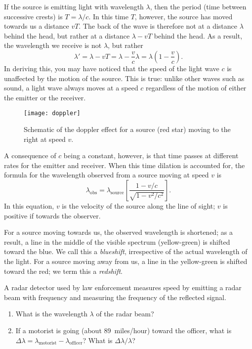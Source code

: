 If the source is emitting light with wavelength $\lambda$, then the period (time between successive crests) is $T = \lambda/c$.  In this time $T$, however, the source has moved towards us a distance $vT$. The back of the wave is therefore not at a distance $\lambda$ behind the head, but rather at a distance $\lambda - vT$ behind the head.  As a result, the wavelength we receive is not $\lambda$, but rather
\[ \lambda' = \lambda - vT = \lambda - \frac{v}{c}\lambda = \lambda\left(1-\frac{v}{c}\right). \]
In deriving this, you may have noticed that the speed of the light wave $c$ is unaffected by the motion of the source.  This is true: unlike other waves such as sound, a light wave always moves at a speed $c$ regardless of the motion of either the emitter or the receiver.

\begin{figure*}
\texttt{[image: doppler]}
\caption[Schematic of the doppler effect]{Schematic of the doppler effect for a source (red star) moving to the right at speed $v$.}
\label{f.doppler}
\end{figure*}

A consequence of $c$ being a constant, however, is that time passes at different rates for the emitter and receiver.  When this time dilation is accounted for, the formula for the wavelength observed from a source moving at speed $v$ is
\begin{equation}\label{e.doppler}
\lambda_{\mathrm{obs}} = \lambda_{\mathrm{source}} \left[\frac{1-v/c}{\sqrt{1-v^{2}/c^{2}}}\right].
\end{equation}
In this equation, $v$ is the velocity of the source along the line of sight; $v$ is positive if towards the observer.

For a source moving towards us, the observed wavelength is shortened; as a result, a line in the middle of the visible spectrum (yellow-green) is shifted toward the blue.  We call this a \emph{blueshift}, irrespective of the actual wavelength of the light.  For a source moving away from us, a line in the yellow-green is shifted toward the red; we term this a \emph{redshift}.

\begin{exercisebox}
A radar detector used by law enforcement measures speed by emitting a radar beam with frequency  and measuring the frequency of the reflected signal.
\begin{enumerate}
\item What is the wavelength $\lambda$ of the radar beam?
\item If a motorist is going  (about 89~miles/hour) toward the officer, what is $\Delta\lambda = \lambda_{\mathrm{motorist}} - \lambda_{\mathrm{officer}}$? What is $\Delta\lambda/\lambda$?
\end{enumerate}
\end{exercisebox}


